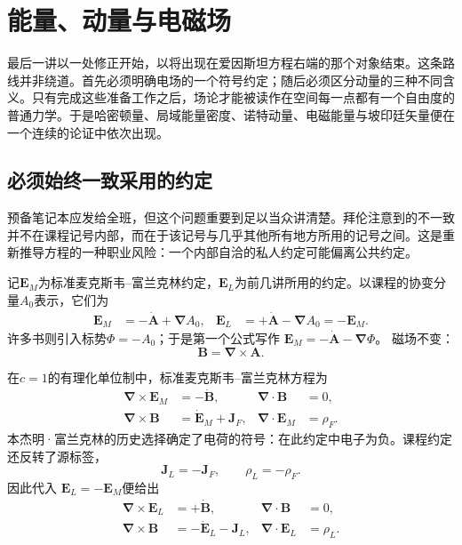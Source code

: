 \chapter{能量、动量与电磁场}

最后一讲以一处修正开始，以将出现在爱因斯坦方程右端的那个对象结束。这条路线并非绕道。首先必须明确电场的一个符号约定；随后必须区分动量的三种不同含义。只有完成这些准备工作之后，场论才能被读作在空间每一点都有一个自由度的普通力学。于是哈密顿量、局域能量密度、诺特动量、电磁能量与坡印廷矢量便在一个连续的论证中依次出现。

\section{必须始终一致采用的约定}

预备笔记本应发给全班，但这个问题重要到足以当众讲清楚。拜伦注意到的不一致并不在课程记号内部，而在于该记号与几乎其他所有地方所用的记号之间。这是重新推导方程的一种职业风险：一个内部自洽的私人约定可能偏离公共约定。

记\(\mathbf E_M\)为标准麦克斯韦--富兰克林约定，\(\mathbf E_L\)为前几讲所用的约定。以课程的协变分量\(A_0\)表示，它们为
\begin{align}
\mathbf E_M
  &= -\dot{\mathbf A}+\boldsymbol{\nabla}A_0,
&
\mathbf E_L
  &= +\dot{\mathbf A}-\boldsymbol{\nabla}A_0
   =-\mathbf E_M .
\label{eq:two-electric-conventions}
\end{align}
许多书则引入标势\(\Phi=-A_0\)；于是第一个公式写作
\(\mathbf E_M=-\dot{\mathbf A}-\boldsymbol{\nabla}\Phi\)。
磁场不变：
\begin{equation}
\mathbf B=\boldsymbol{\nabla}\times\mathbf A.
\label{eq:B-from-A-opening}
\end{equation}

在\(c=1\)的有理化单位制中，标准麦克斯韦--富兰克林方程为
\begin{align}
\boldsymbol{\nabla}\times\mathbf E_M&=-\dot{\mathbf B},
&
\boldsymbol{\nabla}\cdot\mathbf B&=0,
\nonumber\\
\boldsymbol{\nabla}\times\mathbf B&=\dot{\mathbf E}_M+\mathbf J_F,
&
\boldsymbol{\nabla}\cdot\mathbf E_M&=\rho_F .
\label{eq:maxwell-franklin}
\end{align}
本杰明·富兰克林的历史选择确定了电荷的符号：在此约定中电子为负。课程约定还反转了源标签，
\begin{equation}
\mathbf J_L=-\mathbf J_F,
\qquad
\rho_L=-\rho_F.
\label{eq:source-convention-map}
\end{equation}
因此代入
\(\mathbf E_L=-\mathbf E_M\)便给出
\begin{align}
\boldsymbol{\nabla}\times\mathbf E_L&=+\dot{\mathbf B},
&
\boldsymbol{\nabla}\cdot\mathbf B&=0,
\nonumber\\
\boldsymbol{\nabla}\times\mathbf B&=-\dot{\mathbf E}_L-\mathbf J_L,
&
\boldsymbol{\nabla}\cdot\mathbf E_L&=\rho_L .
\label{eq:maxwell-course-convention}
\end{align}

